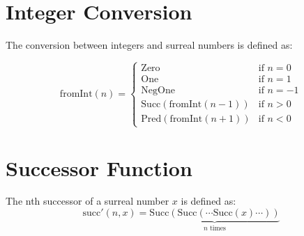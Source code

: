 \documentclass{article}
\begin{document}
\section{Integer Conversion}
The conversion between integers and surreal numbers is defined as:

\begin{equation}
\text{fromInt}(n) = \begin{cases}
\text{Zero} & \text{if } n = 0 \\
\text{One} & \text{if } n = 1 \\
\text{NegOne} & \text{if } n = -1 \\
\text{Succ}(\text{fromInt}(n-1)) & \text{if } n > 0 \\
\text{Pred}(\text{fromInt}(n+1)) & \text{if } n < 0
\end{cases}
\end{equation}

\section{Successor Function}
The nth successor of a surreal number $x$ is defined as:
\begin{equation}
\text{succ}'(n, x) = \underbrace{\text{Succ}(\text{Succ}(\cdots \text{Succ}(x)\cdots))}_{n \text{ times}}
\end{equation}
\end{document}
